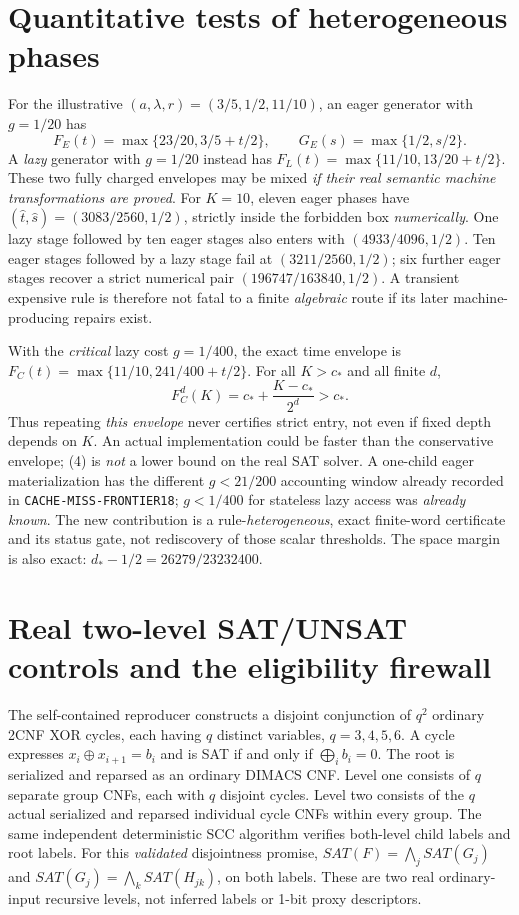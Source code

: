 \documentclass[11pt]{article}
\begin{document}
\section{Quantitative tests of heterogeneous phases}
For the illustrative $(a,\lambda,r)=(3/5,1/2,11/10)$,
an eager generator with $g=1/20$ has
\[
 F_E(t)=\max\{23/20,3/5+t/2\},\qquad
 G_E(s)=\max\{1/2,s/2\}.
\]
A \emph{lazy} generator with $g=1/20$ instead has
$F_L(t)=\max\{11/10,13/20+t/2\}$.
These two fully charged envelopes may be mixed
\emph{if their real semantic machine transformations are proved}.
For $K=10$, eleven eager phases have
$(\widehat t,\widehat s)=(3083/2560,1/2)$, strictly inside
the forbidden box \emph{numerically}.
One lazy stage followed by ten eager stages also enters with
$(4933/4096,1/2)$.
Ten eager stages followed by a lazy stage fail at
$(3211/2560,1/2)$; six further eager stages recover a
strict numerical pair $(196747/163840,1/2)$.
A transient expensive rule is therefore not fatal to a finite
\emph{algebraic} route if its later machine-producing repairs exist.

With the \emph{critical} lazy cost $g=1/400$, the exact time
envelope is $F_C(t)=\max\{11/10,241/400+t/2\}$.
For all $K>c_*$ and all finite $d$,
\[
 F_C^d(K)=c_*+\frac{K-c_*}{2^d}>c_*.
 \tag{4}
\]
Thus repeating \emph{this envelope} never certifies strict
entry, not even if fixed depth depends on $K$.
An actual implementation could be faster than the conservative
envelope; (4) is \emph{not} a lower bound on the real SAT solver.
A one-child eager materialization has the different
$g<21/200$ accounting window already recorded in
\texttt{CACHE-MISS-FRONTIER18}; $g<1/400$
for stateless lazy access was \emph{already known}.
The new contribution is a rule-\emph{heterogeneous},
exact finite-word certificate and its status gate, not rediscovery
of those scalar thresholds.
The space margin is also exact:
$d_*-1/2=26279/23232400$.

\section{Real two-level SAT/UNSAT controls and the eligibility firewall}
The self-contained reproducer constructs a disjoint conjunction
of $q^2$ ordinary 2CNF XOR cycles, each having $q$ distinct
variables, $q=3,4,5,6$.
A cycle expresses $x_i\oplus x_{i+1}=b_i$ and is SAT
if and only if $\bigoplus_i b_i=0$.
The root is serialized and reparsed as an ordinary DIMACS CNF.
Level one consists of $q$ separate group CNFs, each with $q$
disjoint cycles. Level two consists of the $q$ actual serialized
and reparsed individual cycle CNFs within every group.
The same independent deterministic SCC algorithm verifies
both-level child labels and root labels. For this \emph{validated}
disjointness promise, $SAT(F)=\bigwedge_j SAT(G_j)$ and
$SAT(G_j)=\bigwedge_k SAT(H_{jk})$, on both labels.
These are two real ordinary-input recursive levels, not
inferred labels or 1-bit proxy descriptors.
\end{document}
